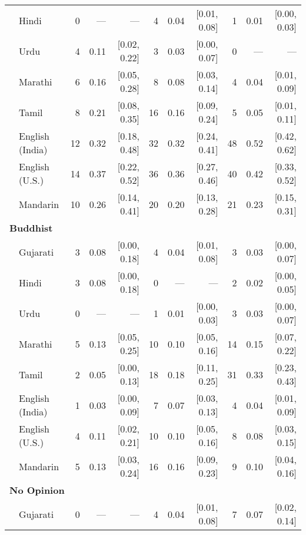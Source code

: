 \begin{table}[H]
\begin{footnotesize}
\begin{tabular}{p{.1in}lrrrrrrrrr}
 & Hindi & 0 & --- & --- & 4 & 0.04 & [0.01, 0.08] & 1 & 0.01 & [0.00, 0.03]\\

 & Urdu & 4 & 0.11 & [0.02, 0.22] & 3 & 0.03 & [0.00, 0.07] & 0 & --- & ---\\

 & Marathi & 6 & 0.16 & [0.05, 0.28] & 8 & 0.08 & [0.03, 0.14] & 4 & 0.04 & [0.01, 0.09]\\

 & Tamil & 8 & 0.21 & [0.08, 0.35] & 16 & 0.16 & [0.09, 0.24] & 5 & 0.05 & [0.01, 0.11]\\

 & English (India) & 12 & 0.32 & [0.18, 0.48] & 32 & 0.32 & [0.24, 0.41] & 48 & 0.52 & [0.42, 0.62]\\

 & English (U.S.) & 14 & 0.37 & [0.22, 0.52] & 36 & 0.36 & [0.27, 0.46] & 40 & 0.42 & [0.33, 0.52]\\
& Mandarin & 10 & 0.26 & [0.14, 0.41] & 20 & 0.20 & [0.13, 0.28] & 21 & 0.23 & [0.15, 0.31]\\
 \midrule
\multicolumn{11}{l}{\textbf{Buddhist}}\\
& Gujarati & 3 & 0.08 & [0.00, 0.18] & 4 & 0.04 & [0.01, 0.08] & 3 & 0.03 & [0.00, 0.07]\\

 & Hindi & 3 & 0.08 & [0.00, 0.18] & 0 & --- & --- & 2 & 0.02 & [0.00, 0.05]\\

 & Urdu & 0 & --- & --- & 1 & 0.01 & [0.00, 0.03] & 3 & 0.03 & [0.00, 0.07]\\

 & Marathi & 5 & 0.13 & [0.05, 0.25] & 10 & 0.10 & [0.05, 0.16] & 14 & 0.15 & [0.07, 0.22]\\

 & Tamil & 2 & 0.05 & [0.00, 0.13] & 18 & 0.18 & [0.11, 0.25] & 31 & 0.33 & [0.23, 0.43]\\

 & English (India) & 1 & 0.03 & [0.00, 0.09] & 7 & 0.07 & [0.03, 0.13] & 4 & 0.04 & [0.01, 0.09]\\

 & English (U.S.) & 4 & 0.11 & [0.02, 0.21] & 10 & 0.10 & [0.05, 0.16] & 8 & 0.08 & [0.03, 0.15]\\

& Mandarin & 5 & 0.13 & [0.03, 0.24] & 16 & 0.16 & [0.09, 0.23] & 9 & 0.10 & [0.04, 0.16]\\
 \midrule
\multicolumn{11}{l}{\textbf{No Opinion}}\\
& Gujarati & 0 & --- & --- & 4 & 0.04 & [0.01, 0.08] & 7 & 0.07 & [0.02, 0.14]\\


\end{tabular}
\end{footnotesize}
\end{table}
